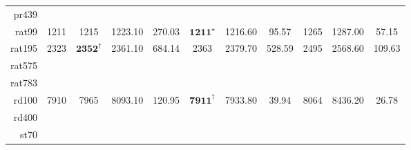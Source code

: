 \documentclass[12pt]{ctexart}
\begin{document}
\begin{table}[htbp]
\begin{tabular}{rcccccccccc}
        pr439                                                                                                                                                                                                                                                                                     \\
        rat99                         & 1211                              & 1215                        & 1223.10                                & 270.03           & $\textbf{1211}^\star$   & 1216.60          & 95.57            & 1265                  & 1287.00          & 57.15            \\
        rat195                        & 2323                              & $\textbf{2352}^\dag$        & 2361.10                                & 684.14           & 2363                    & 2379.70          & 528.59           & 2495                  & 2568.60          & 109.63           \\
        rat575                                                                                                                                                                                                                                                                                    \\
        rat783                                                                                                                                                                                                                                                                                    \\
        rd100                         & 7910                              & 7965                        & 8093.10                                & 120.95           & $\textbf{7911}^\dag$    & 7933.80          & 39.94            & 8064                  & 8436.20          & 26.78            \\
        rd400                                                                                                                                                                                                                                                                                     \\
        st70                                                                                                                                                                                                                                                                                      \\

\end{tabular}
\end{table}
\end{document}
